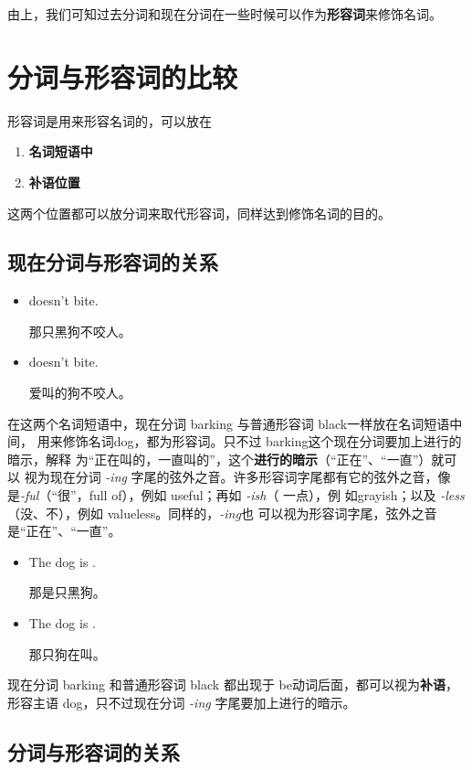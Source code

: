 由上，我们可知过去分词和现在分词在一些时候可以作为\textbf{形容词}来修饰名词。

\section{分词与形容词的比较}

形容词是用来形容名词的，可以放在
\begin{enumerate}
\item \textbf{名词短语中}
\item \textbf{补语位置}
\end{enumerate}
这两个位置都可以放分词来取代形容词，同样达到修饰名词的目的。

\subsection{现在分词与形容词的关系}

\begin{itemize}
\item {} doesn't bite.

  那只黑狗不咬人。
\item {} doesn't bite.

爱叫的狗不咬人。
\end{itemize}

在这两个名词短语中，现在分词 barking 与普通形容词 black一样放在名词短语中间，
用来修饰名词dog，都为形容词。只不过 barking这个现在分词要加上进行的暗示，解释
为“正在叫的，一直叫的”，这个\textbf{进行的暗示}（“正在”、“一直”）就可以
视为现在分词 \emph{-ing} 字尾的弦外之音。许多形容词字尾都有它的弦外之音，像
是\emph{-ful}（“很”，full of），例如 useful；再如 \emph{-ish}（ 一点），例
如grayish；以及 \emph{-less}（没、不），例如 valueless。同样的，\emph{-ing}也
可以视为形容词字尾，弦外之音是“正在”、“一直”。

\begin{itemize}
\item The dog is .

那是只黑狗。
\item The dog is .

那只狗在叫。
\end{itemize}

现在分词 barking 和普通形容词 black 都出现于 be动词后面，都可以视为\textbf{补语}，
形容主语 dog，只不过现在分词 \emph{-ing} 字尾要加上进行的暗示。

\subsection{分词与形容词的关系}

